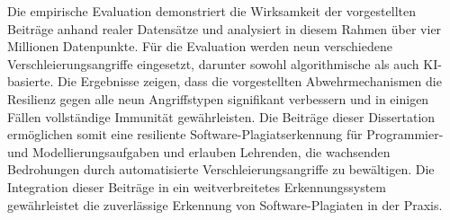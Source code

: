 {Die empirische Evaluation demonstriert die Wirksamkeit der vorgestellten Beiträge anhand realer Datensätze und analysiert in diesem Rahmen über vier Millionen Datenpunkte.
Für die Evaluation werden neun verschiedene Verschleierungsangriffe eingesetzt, darunter sowohl algorithmische als auch KI-basierte.
Die Ergebnisse zeigen, dass die vorgestellten Abwehrmechanismen die Resilienz gegen alle neun Angriffstypen signifikant verbessern und in einigen Fällen vollständige Immunität gewährleisten.
Die Beiträge dieser Dissertation ermöglichen somit eine resiliente Software-Plagiatserkennung für Programmier- und Modellierungsaufgaben und erlauben Lehrenden, die wachsenden Bedrohungen durch automatisierte Verschleierungsangriffe zu bewältigen.
Die Integration dieser Beiträge in ein weitverbreitetes Erkennungssystem gewährleistet die zuverlässige Erkennung von Software-Plagiaten in der Praxis.
%
}


\endinput

